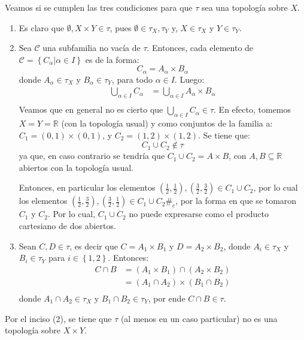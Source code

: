 \documentclass[12pt]{report}
\theoremstyle{largebreak}
\newcommand{\contradiction}{\ensuremath{\#_c}}
\begin{document}
    \begin{sol}
        Veamos si se cumplen las tres condiciones para que $\tau$ sea una topología sobre $X$.
        \begin{enumerate}
            \item Es claro que $\emptyset,X\times Y \in\tau$, pues $\emptyset\in\tau_X,\tau_Y$ y, $X\in\tau_X$ y $Y\in\tau_Y$.
            \item Sea $\mathcal{C}$ una subfamilia no vacía de $\tau$. Entonces, cada elemento de $\mathcal{C}=\left\{C_\alpha\big|\alpha\in I \right\}$ es de la forma:
            \begin{equation*}
                C_\alpha=A_\alpha\times B_\alpha
            \end{equation*}
            donde $A_\alpha\in \tau_X$ y $B_\alpha\in\tau_Y$, para todo $\alpha\in I$. Luego:
            \begin{equation*}
                \begin{split}
                    \bigcup_{\alpha\in I}C_\alpha&=\bigcup_{\alpha\in I}A_\alpha\times B_\alpha \\
                \end{split}
            \end{equation*}
            Veamos que en general no es cierto que $\bigcup_{\alpha\in I}C_\alpha\in\tau$. En efecto, tomemos $X=Y=\mathbb{R}$ (con la topología usual) y como conjuntos de la familia a: $C_1=(0,1)\times(0,1)$, y $C_2=(1,2)\times(1,2)$. Se tiene que:
            \begin{equation*}
                C_1\cup C_2\notin\tau
            \end{equation*}
            ya que, en caso contrario se tendría que $C_1\cup C_2=A\times B$, con $A,B\subseteq\mathbb{R}$ abiertos con la topología usual. 
            
            Entonces, en particular los elementos $(\frac{1}{2},\frac{1}{2}),(\frac{3}{2},\frac{3}{2})\in C_1\cup C_2$, por lo cual los elementos $(\frac{1}{2},\frac{3}{2}),(\frac{3}{2},\frac{1}{2})\in C_1\cup C_2$\contradiction, por la forma en que se tomaron $C_1$ y $C_2$. Por lo cual, $C_1\cup C_2$ no puede expresarse como el producto cartesiano de dos abiertos.
            \item Sean $C,D\in\tau$, es decir que $C=A_1\times B_1$ y $D=A_2\times B_2$, donde $A_i\in\tau_X$ y $B_i\in\tau_Y$ para $i\in\left\{1,2\right\}$. Entonces:
            \begin{equation*}
                \begin{split}
                    C\cap B&= (A_1\times B_1)\cap(A_2\times B_2)\\
                    &= (A_1\cap A_2)\times (B_1\cap B_2) \\
                \end{split}
            \end{equation*}
            donde $A_1\cap A_2\in\tau_X$ y $B_1\cap B_2\in\tau_Y$, por ende $C\cap B\in\tau$.
        \end{enumerate}
        Por el inciso (2), se tiene que $\tau$ (al menos en un caso particular) no es una topología sobre $X\times Y$.
    \end{sol}
\end{document}
